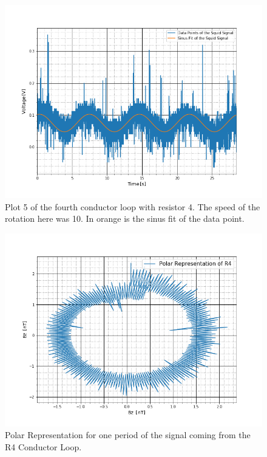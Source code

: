 \begin{figure}[ht]
	\includegraphics[scale=0.5]{Bild/r4_10_3}
	\centering
	\caption[Plot of fourth conductor loop 5]{Plot 5 of the fourth conductor loop with resistor 4. The speed of the rotation here was 10. In orange is the sinus fit of the data point.}
\end{figure}
\begin{figure}[ht]
	\includegraphics[scale=0.5]{Bild/R4}
	\centering
	\caption[Polar Representation for R4 Conductor Loop]{Polar Representation for one period of the signal coming from the R4 Conductor Loop.}
\end{figure}
